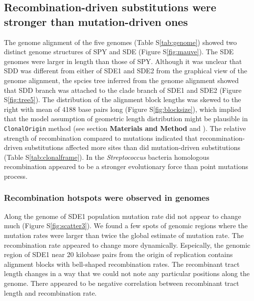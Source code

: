 \documentclass[english]{article}
\begin{document}
\subsection{Recombination-driven substitutions were stronger than mutation-driven ones}

The genome alignment of the five genomes (Table S\ref{tab:genome}) showed two distinct
genome structures of SPY and SDE (Figure S\ref{fig:mauve}). The SDE genomes were
larger in length than those of SPY. Although it was unclear that SDD was
different from either of SDE1 and SDE2 from the graphical view of the genome
alignment, the spcies tree inferred from the genome alignment showed that SDD
branch was attached to the clade branch of SDE1 and SDE2 (Figure
S\ref{fig:tree5}). The distribution of the alignment block lengths was skewed to
the right with mean of 4188 base pairs long (Figure S\ref{fig:blocksize}), which
implied that the model assumption of geometric length distribution might be
plausible in \texttt{ClonalOrigin} method (see section \textbf{Materials and
Method} and \citealt{Didelot2010}).  The relative strength of recombination
compared to mutations indicated that reconmination-driven substitutions affected
more sites than did mutation-driven substitutions (Table
S\ref{tab:clonalframe}). In the \textit{Streptococcus} bacteria homologous
recombination appeared to be a stronger evolutionary force than point mutations 
process.

\subsubsection{Recombination hotspots were observed in genomes}

Along the genome of SDE1 population mutation rate did not appear to change much
(Figure S\ref{fig:scatter3}).  We found a few spots of genomic regions where the
mutation rates were larger than twice the global estimate of mutation rate.
The recombination rate appeared to change more dynamically. Espeically, the
genomic region of SDE1 near 20 kilobase pairs from the origin of replication
contains alignment blocks with bell-shaped recombination rates.
The recombinant tract length changes in a way that we could not note any
particular positions along the genome.
There appeared to be negative correlation between recombinant tract length and
recombination rate.
\end{document}
